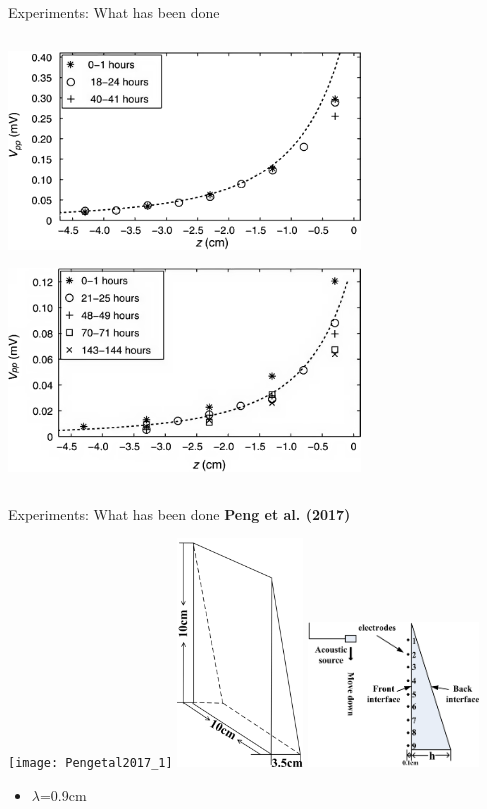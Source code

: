 \documentclass[utf8]{beamer} \usetheme{lfcr} %
\begin{document}
\begin{frame}{Experiments: What has been done}
\begin{columns}
\begin{column}{0.5\textwidth}
      \includegraphics[width=0.7\textwidth]{Schakeletal2011_2}%

      \includegraphics[width=0.7\textwidth]{Schakeletal2011_4}%
    \end{column}
  \end{columns}
\end{frame}
%
\begin{frame}{Experiments: What has been done}
  {\textbf{Peng et al. (2017)}}

      \texttt{[image: Pengetal2017\_1]}%
      \includegraphics[width=0.25\textwidth]{Pengetal2017_2}%
      \includegraphics[width=0.34\textwidth]{Pengetal2017_3}%

      \begin{itemize}
        \item{$\lambda$=0.9cm}
      \end{itemize}
     
\end{frame}
\end{document}
